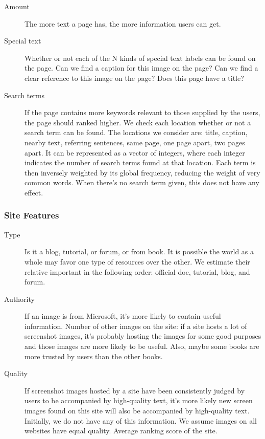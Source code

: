 \documentclass{www2010-submission}
\begin{document}
\begin{description}

\item[Amount]
The more text a page has, the more information users can get.

\item[Special text]
Whether or not each of the N kinds of special text labels can be
found on the page. Can we find a caption for this image on the
page? Can we find a clear reference to this image on the page?
Does this page have a title?

\item[Search terms]
If the page contains more keywords relevant to those supplied by
the users, the page should ranked higher. We check each location
whether or not a search term can be found. The locations we
consider are: title, caption, nearby text, referring sentences,
same page, one page apart, two pages apart. It can be represented
as a vector of integers, where each integer indicates the number
of search terms found at that location. Each term is then
inversely weighted by its global frequency, reducing the weight of
very common words. When there's no search term given, this does
not have any effect.
\end{description}

\subsubsection{Site Features}

\begin{description}

\item[Type]

Is it a blog, tutorial, or forum, or from book. It is possible the
world as a whole may favor one type of resources over the other.
We estimate their relative important in the following order:
official doc, tutorial, blog, and forum.

\item[Authority]

If an image is from Microsoft, it's more likely to contain useful
information. Number of other images on the site: if a site hosts a
lot of screenshot images, it's probably hosting the images for
some good purposes and those images are more likely to be useful.
Also, maybe some books are more trusted by users than the other
books.

\item[Quality]

If screenshot images hosted by a site have been consistently
judged by users to be accompanied by high-quality text, it's more
likely new screen images found on this site will also be
accompanied by high-quality text. Initially, we do not have any of
this information. We assume images on all websites have equal
quality. Average ranking score of the site.

\end{description}
\end{document}
